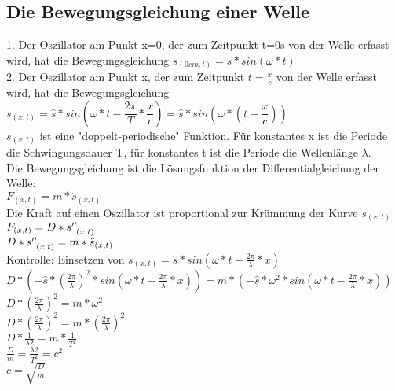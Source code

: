 \subsection{Die Bewegungsgleichung einer Welle}
1. Der Oszillator am Punkt x=0, der zum Zeitpunkt t=0s von der Welle erfasst wird, hat die Bewegungsgleichung $ s_{(0cm, t)} = \hat{s} \ast sin(\omega \ast t) $ 
\vspace{2mm} \\
2. Der Oszillator am Punkt x, der zum Zeitpunkt $ t = \frac{x}{c} $ von der Welle erfasst wird, hat die Bewegungsgleichung $ s_{(x, t)} = \hat{s} \ast sin(\omega \ast t - \dfrac{2 \pi}{T} \ast \dfrac{x}{c})  = \hat{s} \ast sin(\omega \ast (t - \dfrac{x}{c})) $ 
\vspace{3mm} \\
$ s_{(x,t)} $ ist eine "doppelt-periodische" Funktion. Für konstantes x ist die Periode die Schwingungsdauer T, für konstantes t ist die Periode die Wellenlänge $\lambda$. 
\vspace{2mm} \\
Die Bewegungsgleichung ist die Lösungsfunktion der Differentialgleichung der Welle: \\ $ F_{(x,t)} = m \ast \ddot{s}_{(x,t)} $ \\
Die Kraft auf einen Oszillator ist proportional zur Krümmung der Kurve $ s_{(x,t)} $ 
\vspace{2mm} \\
$ F_{(x,t)} = D \ast s''_{\hspace{1,5mm}(x,t)} $ 
\vspace{2mm} \\
$ D \ast s''_{\hspace{1,5mm}(x,t)} = m \ast \ddot{s}_{(x,t)} $	
\vspace{2mm} \\
Kontrolle: Einsetzen von $s_{(x,t)} = \hat{s} \ast sin(\omega \ast t - \frac{2\pi}{\lambda} \ast x) $
\vspace{3mm} \\
$ D \ast (-\hat{s} \ast (\frac{2\pi}{\lambda})^{2} \ast sin(\omega \ast t - \frac{2\pi}{\lambda} \ast x)) = m \ast (-\hat{s} \ast \omega^{2} \ast sin(\omega \ast t - \frac{2\pi}{\lambda} \ast x)) $
\vspace{2mm} \\
$ D \ast (\frac{2\pi}{\lambda})^{2} = m \ast \omega^{2} $ 
\vspace{2mm} \\
$ D \ast (\frac{2\pi}{\lambda})^{2} = m \ast (\frac{2\pi}{\lambda})^{2} $
\vspace{2mm} \\
$ D \ast \frac{1}{\lambda{2}} = m \ast \frac{1}{T^{2}} $
\vspace{2mm} \\
$ \frac{D}{m} = \frac{\lambda{2}}{T^{2}} = c^{2} $
\vspace{2mm} \\
$ c = \sqrt{\frac{D}{m}} $	

